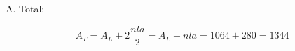 \documentclass[12pt,addpoints]{evalua}
\begin{document}
\begin{questions}
{\begin{parts}
\begin{minipage}{.75\linewidth}
				A. Total:\\[-2em]
				\begin{solutionbox}{1.5cm}
					\[A_T=A_L+2\dfrac{nla}{2}=A_L+nla=1064+280=1344\]
				\end{solutionbox}
			\end{minipage}
		\end{parts}
	}










\end{questions}
\end{document}
